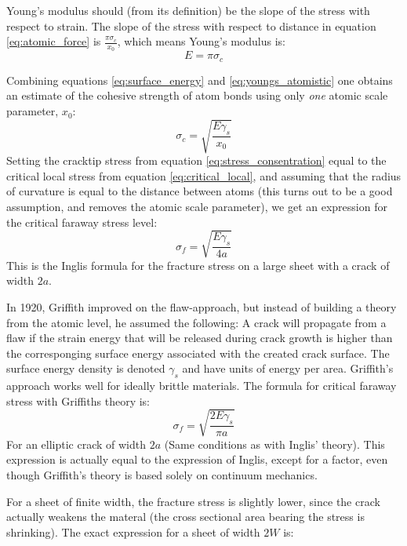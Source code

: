 Young's modulus should (from its definition) be the slope of the stress with respect to strain. The slope of the stress with respect to distance in equation \ref{eq:atomic_force} is $\frac{\pi\sigma_c}{x_0}$, which means Young's modulus is:
\begin{equation}
E = \pi\sigma_c
\label{eq:youngs_atomistic}
\end{equation}

Combining equations \ref{eq:surface_energy} and \ref{eq:youngs_atomistic} one obtains an estimate of the cohesive strength of atom bonds using only \emph{one} atomic scale parameter, $x_0$:
\begin{equation}
	\sigma_c = \sqrt{\frac{E\gamma_s}{x_0}}
	\label{eq:critical_local}
\end{equation}
Setting the cracktip stress from equation \ref{eq:stress_consentration} equal to the critical local stress from equation \ref{eq:critical_local}, and assuming that the radius of curvature is equal to the distance between atoms (this turns out to be a good assumption, and removes the atomic scale parameter), we get an expression for the critical faraway stress level:
\begin{equation}
	\sigma_f = \sqrt{\frac{E\gamma_s}{4a}}
	\label{eq:inglis_formula}
\end{equation}
This is the Inglis formula for the fracture stress on a large sheet with a crack of width $2a$.

In 1920, Griffith improved on the flaw-approach, but instead of building a theory from the atomic level, he assumed the following: A crack will propagate from a flaw if the strain energy that will be released during crack growth is higher than the corresponging surface energy associated with the created crack surface. The surface energy density is denoted $\gamma_s$ and have units of energy per area. Griffith's approach works well for ideally brittle materials. The formula for critical faraway stress with Griffiths theory is:
\begin{equation}
	\sigma_f = \sqrt{\frac{2E\gamma_s}{\pi a}}
\end{equation}
For an elliptic crack of width $2a$ (Same conditions as with Inglis' theory). This expression is actually equal to the expression of Inglis, except for a factor, even though Griffith's theory is based solely on continuum mechanics.

For a sheet of finite width, the fracture stress is slightly lower, since the crack actually weakens the materal (the cross sectional area bearing the stress is shrinking). The exact expression for a sheet of width $2W$ is:

